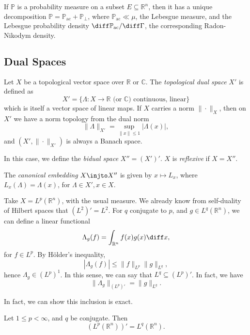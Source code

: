 \documentclass[12pt]{article}
\begin{document}
\begin{remark}
	If $\mathbb{P}$ is a probability measure on a subset $E \subseteq \mathbb{R}^n$, then it has a unique decomposition $\mathbb{P} = \mathbb{P}_{\mathrm{ac}} + \mathbb{P}_{\perp}$, where $\mathbb{P}_{\mathrm{ac}} \ll \mu$, the Lebesgue measure, and the Lebesgue probability density $\diff \mathbb{P}_{\mathrm{ac}} / \diff \Gamma$, the corresponding Radon-Nikodym density.
\end{remark}

\subsection{Dual Spaces}
\label{sub:dual_spac}

Let $X$ be a topological vector space over $\mathbb{R}$ or $\mathbb{C}$. The \emph{topological dual space} $X'$ is defined as
\[
	X' = \{ \Lambda : X \to \mathbb{R} \text{ (or $\mathbb{C}$) continuous, linear}\}
\]
which is itself a vector space of linear maps. If $X$ carries a norm $\|\cdot\|_X$, then on $X'$ we have a norm topology from the dual norm
\[
\|\Lambda\|_{X'} = \sup_{\|x\| \leq 1} |\Lambda(x)|,
\]
and $(X', \|\cdot\|_{X'})$ is always a Banach space.

In this case, we define the \emph{bidual space} $X'' = (X')'$. $X$ is \emph{reflexive} if $X = X''$.


The \emph{canonical embedding} $X \injto X''$ is given by $x \mapsto L_x$, where $L_x(\Lambda) = \Lambda(x)$, for $\Lambda \in X', x \in X$.

\begin{exbox}
	Take $X = L^p(\mathbb{R}^n)$, with the usual measure. We already know from self-duality of Hilbert spaces that $(L^2)' = L^2$. For $q$ conjugate to $p$, and $g \in L^q(\mathbb{R}^n)$, we can define a linear functional
	\[
	\Lambda_g(f) = \int_{\mathbb{R}^n} f(x) g(x) \diff x,
	\]
	for $f \in L^p$. By H\"older's inequality,
	\[
	|\Lambda_g(f)| \leq \|f\|_{L^p} \|g\|_{L^q},
	\]
	hence $\Lambda_g \in (L^p)^1$. In this sense, we can say that $L^q \subseteq (L^p)'$. In fact, we have
	\[
	\|\Lambda_g\|_{(L^p)'} = \|g\|_{L^q}.
	\]
\end{exbox}

In fact, we can show this inclusion is exact.

\begin{theorem}
	Let $1 \leq p < \infty$, and $q$ be conjugate. Then
	\[
		(L^p(\mathbb{R}^n))' = L^q(\mathbb{R}^n).
	\]
\end{theorem}
\end{document}
